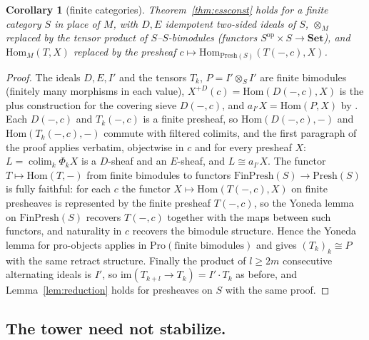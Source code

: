 \documentclass[11pt]{amsart}
\newtheorem{cor}[thm]{Corollary}
\theoremstyle{definition}
\newcommand{\Presh}{\mathrm{Presh}}
\newcommand{\Hom}{\mathrm{Hom}}
\begin{document}
\begin{cor}[finite categories]\label{cor:essconst}
Theorem~\ref{thm:essconst} holds for a finite category $S$ in place of $M$,
with $D,E$ idempotent two-sided ideals of $S$, $\otimes_M$ replaced by the
tensor product of $S$--$S$-bimodules (functors $S^{\mathrm{op}}\times S\to\mathbf{Set}$),
and $\Hom_M(T,X)$ replaced by the presheaf $c\mapsto\Hom_{\Presh(S)}(T(-,c),X)$.
\end{cor}
\begin{proof}
The ideals $D,E,I'$ and the tensors $T_k$, $P=I'\otimes_SI'$ are finite bimodules
(finitely many morphisms in each value), $X^{+D}(c)=\Hom(D(-,c),X)$ is the plus
construction for the covering sieve $D(-,c)$, and $a_{I'}X=\Hom(P,X)$ by
\cite[Thm.~6.10]{Topjoin}. Each $D(-,c)$ and $T_k(-,c)$ is a finite presheaf, so
$\Hom(D(-,c),-)$ and $\Hom(T_k(-,c),-)$ commute with filtered colimits, and the
first paragraph of the proof applies verbatim, objectwise in $c$ and for every
presheaf $X$: $L=\operatorname{colim}_k\Phi_kX$ is a $D$-sheaf and an $E$-sheaf, and
$L\cong a_{I'}X$. The functor $T\mapsto\Hom(T,-)$
from finite bimodules to functors $\mathrm{Fin}\Presh(S)\to\Presh(S)$ is fully
faithful: for each $c$ the functor $X\mapsto\Hom(T(-,c),X)$ on finite presheaves
is represented by the finite presheaf $T(-,c)$, so the Yoneda lemma on
$\mathrm{Fin}\Presh(S)$ recovers $T(-,c)$ together with the maps between such
functors, and naturality in $c$ recovers the bimodule structure. Hence the
Yoneda lemma for pro-objects applies in
$\mathrm{Pro}(\text{finite bimodules})$ and gives $(T_k)_k\cong P$ with the same
retract structure. Finally the product of $l\ge2m$ consecutive alternating
ideals is $I'$, so $\mathrm{im}(T_{k+l}\to T_k)=I'\cdot T_k$ as before, and
Lemma~\ref{lem:reduction} holds for presheaves on $S$ with the same proof.
\end{proof}

\subsection{The tower need not stabilize.}
\end{document}
